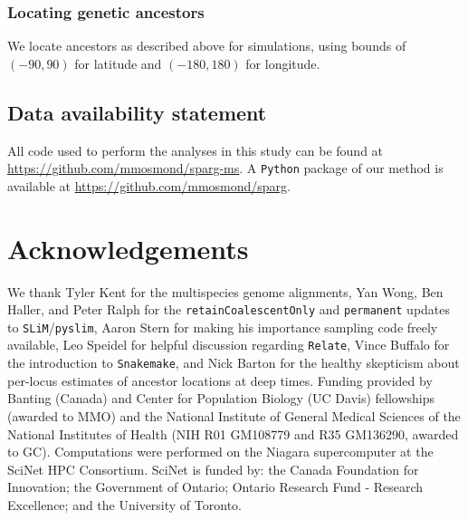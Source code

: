 \documentclass[12pt]{article}
\begin{document}
\subsubsection*{Locating genetic ancestors}

We locate ancestors as described above for simulations, using bounds of $(-90,90)$ for latitude and  $(-180,180)$ for longitude.

\subsection*{Data availability statement}

All code used to perform the analyses in this study can be found at \url{https://github.com/mmosmond/sparg-ms}.
A \texttt{Python} package of our method is available at \url{https://github.com/mmosmond/sparg}.

\section*{Acknowledgements}

We thank Tyler Kent for the multispecies genome alignments,
Yan Wong, Ben Haller, and Peter Ralph for the \texttt{retainCoalescentOnly} and \texttt{permanent} updates to \texttt{SLiM}/\texttt{pyslim}, 
Aaron Stern for making his importance sampling code freely available, 
Leo Speidel for helpful discussion regarding \texttt{Relate}, 
Vince Buffalo for the introduction to \texttt{Snakemake},
and Nick Barton for the healthy skepticism about per-locus estimates of ancestor locations at deep times.
%
Funding provided by Banting (Canada) and Center for Population Biology (UC Davis) fellowships (awarded to MMO) and the National Institute of General Medical Sciences of the National Institutes of Health (NIH R01 GM108779 and R35 GM136290, awarded to GC).
Computations were performed on the Niagara supercomputer at the SciNet HPC Consortium. SciNet is funded by: the Canada Foundation for Innovation; the Government of Ontario; Ontario Research Fund - Research Excellence; and the University of Toronto.

%
\end{document}
